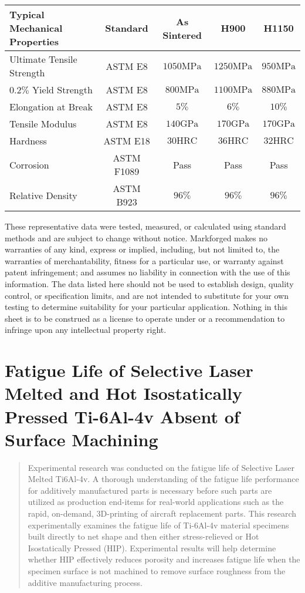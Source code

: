 \documentclass[10pt]{article}
\begin{document}
\begin{center}
\begin{tabular}{lcccc}
Typical Mechanical Properties & Standard & As Sintered & H900 & H1150 \\
\hline
Ultimate Tensile Strength & ASTM E8 & $1050 \mathrm{MPa}$ & $1250 \mathrm{MPa}$ & $950 \mathrm{MPa}$ \\
\hline
$0.2 \%$ Yield Strength & ASTM E8 & $800 \mathrm{MPa}$ & $1100 \mathrm{MPa}$ & $880 \mathrm{MPa}$ \\
\hline
Elongation at Break & ASTM E8 & $5 \%$ & $6 \%$ & $10 \%$ \\
\hline
Tensile Modulus & ASTM E8 & $140 \mathrm{GPa}$ & $170 \mathrm{GPa}$ & $170 \mathrm{GPa}$ \\
\hline
Hardness & ASTM E18 & $30 \mathrm{HRC}$ & $36 \mathrm{HRC}$ & $32 \mathrm{HRC}$ \\
\hline
Corrosion & ASTM F1089 & Pass & Pass & Pass \\
\hline
Relative Density & ASTM B923 & $96 \%$ & $96 \%$ & $96 \%$ \\
\hline
\end{tabular}
\end{center}

These representative data were tested, measured, or calculated using standard methods and are subject to change without notice. Markforged makes no warranties of any kind, express or implied, including, but not limited to, the warranties of merchantability, fitness for a particular use, or warranty against patent infringement; and assumes no liability in connection with the use of this information. The data listed here should not be used to establish design, quality control, or specification limits, and are not intended to substitute for your own testing to determine suitability for your particular application. Nothing in this sheet is to be construed as a license to operate under or a recommendation to infringe upon any intellectual property right.

\section*{Fatigue Life of Selective Laser Melted and Hot Isostatically Pressed Ti-6Al-4v Absent of Surface Machining }


\begin{abstract}
Experimental research was conducted on the fatigue life of Selective Laser Melted Ti6Al-4v. A thorough understanding of the fatigue life performance for additively manufactured parts is necessary before such parts are utilized as production end-items for real-world applications such as the rapid, on-demand, 3D-printing of aircraft replacement parts. This research experimentally examines the fatigue life of Ti-6Al-4v material specimens built directly to net shape and then either stress-relieved or Hot Isostatically Pressed (HIP). Experimental results will help determine whether HIP effectively reduces porosity and increases fatigue life when the specimen surface is not machined to remove surface roughness from the additive manufacturing process.
\end{abstract}
\end{document}
